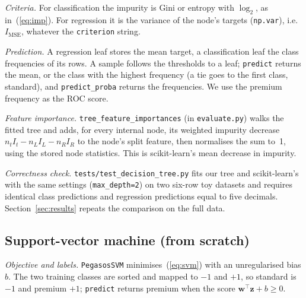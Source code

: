 \documentclass[10pt,twocolumn,a4paper]{article}
\begin{document}
\textit{Criteria.} For classification the impurity is Gini or entropy
with $\log_2$, as in~(\ref{eq:imp}). For regression it is the variance of
the node's targets (\texttt{np.var}), i.e.\ $I_{\text{MSE}}$, whatever
the \texttt{criterion} string. %

\textit{Prediction.} A regression leaf stores the mean target, a
classification leaf the class frequencies of its rows. %
A sample follows the thresholds to a leaf; \texttt{predict} returns the
mean, or the class with the highest frequency (a tie goes to the first
class, standard), and \texttt{predict\_proba} returns the frequencies. %
We use the premium frequency as the ROC score. %

\textit{Feature importance.} \texttt{tree\_feature\_importances} (in
\texttt{evaluate.py}) walks the fitted tree and adds, for every internal node, its weighted
impurity decrease $n_t I_t - n_L I_L - n_R I_R$ to the node's split
feature, then normalises the sum to~1, using the stored node
statistics. This is scikit-learn's mean decrease in impurity. %

\textit{Correctness check.} \texttt{tests/test\_decision\_tree.py} fits
our tree and scikit-learn's with the same settings (\texttt{max\_depth=2})
on two six-row toy datasets and requires identical class predictions and
regression predictions equal to five decimals. %
Section~\ref{sec:results} repeats the comparison on the full data.

\subsection{Support-vector machine (from scratch)}
\textit{Objective and labels.} \texttt{PegasosSVM} minimises~(\ref{eq:svm})
with an unregularised bias $b$. %
The two training classes are sorted and mapped to $-1$ and $+1$, so
standard is $-1$ and premium $+1$; \texttt{predict} returns premium when
the score $\mathbf{w}^\top\mathbf{z} + b \ge 0$. %
\end{document}

